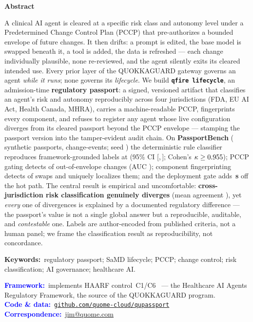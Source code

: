 \documentclass[11pt]{article}
\begin{document}
\vspace{0.5em}
\begin{tcolorbox}[breakable, enhanced jigsaw, colback=black!4, colframe=black!4,
  arc=5pt, boxrule=0pt, left=16pt, right=16pt, top=10pt, bottom=10pt]
\setlength{\parskip}{0pt}
{\centering\large\bfseries Abstract\par}
\smallskip
\fontsize{9.5}{11.3}\selectfont
A clinical AI agent is cleared at a specific risk class and autonomy level under a
Predetermined Change Control Plan (PCCP) that pre-authorizes a bounded envelope of
future changes. It then drifts: a prompt is edited, the base model is swapped beneath
it, a tool is added, the data is refreshed --- each change individually plausible,
none re-reviewed, and the agent silently exits its cleared intended use. Every prior
layer of the QUOKKAGUARD gateway governs an agent \emph{while it runs}; none governs
its \emph{lifecycle}. We build \textbf{\texttt{qfire lifecycle}}, an admission-time
\textbf{regulatory passport}: a signed, versioned artifact that classifies an agent's
risk and autonomy reproducibly across four jurisdictions (FDA, EU AI Act, Health
Canada, MHRA), carries a machine-readable PCCP, fingerprints every component, and
refuses to register any agent whose live configuration diverges from its cleared
passport beyond the PCCP envelope --- stamping the passport version into the
tamper-evident audit chain. On \textbf{PassportBench} (\NumPassports{} synthetic
passports, \NumChanges{} change-events; seed \Seed) the deterministic rule classifier
reproduces framework-grounded labels at \textbf{\ClaOverall} (95\% CI
[\ClaLo,\,\ClaHi]; Cohen's $\kappa\geq0.955$); PCCP gating detects
\textbf{\Pgd} of out-of-envelope changes (AUC \PccpAUC); component fingerprinting
detects \textbf{\Cfd} of swaps and uniquely localizes them; and the deployment gate
adds \textbf{\GateMedian\,\textmu s} off the hot path. The central result is
empirical and uncomfortable: \textbf{cross-jurisdiction risk classification genuinely
diverges} (mean agreement \Hca), yet \emph{every} one of \NumDiverge{} divergences is
explained by a documented regulatory difference --- the passport's value is not a
single global answer but a reproducible, auditable, and \emph{contestable} one.
Labels are author-encoded from published criteria, not a human panel; we frame the
classification result as reproducibility, not concordance.

\medskip
\noindent\textbf{Keywords:}~regulatory passport; SaMD lifecycle; PCCP; change
control; risk classification; AI governance; healthcare AI.

\medskip
\noindent\textcolor{blue}{\textbf{Framework:}}~implements HAARF control~C1/C6~\cite{schwoebel2026haarf} --- the Healthcare AI Agents Regulatory Framework, the source of the QUOKKAGUARD program.\\
\noindent\textcolor{blue}{\textbf{Code \& data:}}~\href{https://github.com/quome-cloud/qupassport}{\texttt{github.com/quome-cloud/qupassport}}\\
\noindent\textcolor{blue}{\textbf{Correspondence:}}~\href{mailto:jim@quome.com}{jim@quome.com}
\end{tcolorbox}
\end{document}
